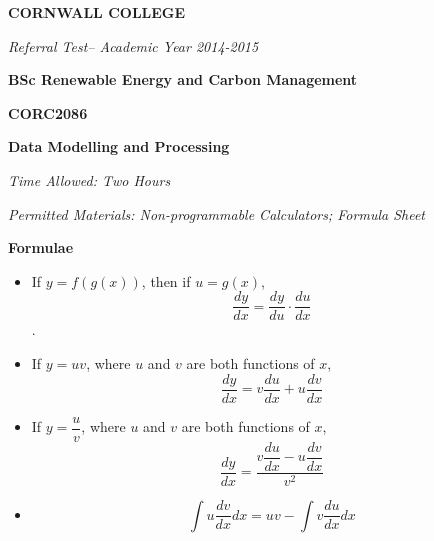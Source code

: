 \documentclass[a4paper,12pt,fleqn]{article}
\newcommand{\institution}{CORNWALL COLLEGE}
\newcommand{\titlehd}{BSc Renewable Energy and Carbon Management}
\newcommand{\examtype}{Referral Test}
\newcommand{\examdate}{Academic Year 2014-2015}
\newcommand{\examcode}{CORC2086}
\newcommand{\examtitle}{Data Modelling and Processing}
\newcommand{\readtime}{15 Minutes}
\newcommand{\writetime}{Two Hours}
\newcommand{\materials}{Non-programmable Calculators; Formula Sheet}
\begin{document}

\begin{center}
\large\textbf{\institution}
\end{center}
\vspace{1cm}

\begin{center}
\textit{ \examtype -- \examdate}
\end{center}
\vspace{1cm}

\begin{center}
\large\textbf{\titlehd}
\end{center}

\begin{center}
\large\textbf{\examcode}
\end{center}
\begin{center}
\large\textbf{\examtitle}
\end{center}
\vspace{4cm}
\vspace{4cm}

\begin{center}
\end{center}
\begin{center}
\textit{Time Allowed:  \writetime}
\end{center}
\begin{center}
\textit{Permitted Materials: \materials}
\end{center}

\newpage
\textbf{Formulae}
\newline
\begin{itemize}

\item If $y=f(g(x))$, then if $u=g(x)$,\[\dfrac{dy}{dx}=\dfrac{dy}{du}\cdot\dfrac{du}{dx}\] .
\newline
\item If $y =uv$, where $u$ and $v$ are both functions of $x$, \[\dfrac{dy}{dx}=v\dfrac{du}{dx}+u\dfrac{dv}{dx}\] 
\newline
\item If $y=\dfrac{u}{v}$, where $u$ and $v$ are both functions of $x$, \[\dfrac{dy}{dx}=\dfrac{v\dfrac{du}{dx}-u\dfrac{dv}{dx}}{v^2}\]
\item \[\int u\dfrac{dv}{dx}dx=uv-\int v\dfrac{du}{dx}dx\]
\end{itemize}
\end{document}
